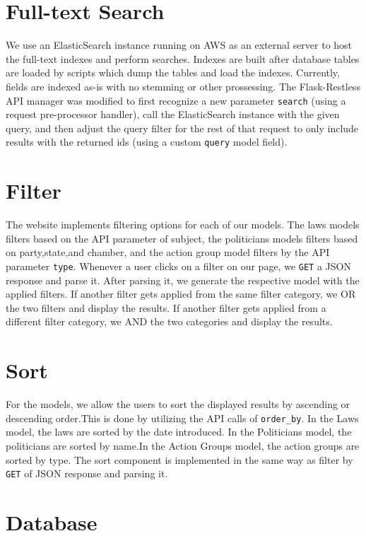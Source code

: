 \documentclass[12pt]{article}
\newcommand{\code}[1]{\texttt{#1}}
\begin{document}
\section{Full-text Search}

We use an ElasticSearch instance running on AWS as an external server to host the full-text indexes and perform searches. Indexes are built after database tables are loaded by scripts which dump the tables and load the indexes. Currently, fields are indexed as-is with no stemming or other prossessing. The Flask-Restless API manager was modified to first recognize a new parameter \code{search} (using a request pre-processor handler), call the ElasticSearch instance with the given query, and then adjust the query filter for the rest of that request to only include results with the returned ids (using a custom \code{query} model field).

\section{Filter}

The website implements filtering options for each of our models. The laws models filters based on the API parameter of subject, the politicians models filters based on party,state,and chamber, and the action group model filters by the API parameter \code{type}. Whenever a user clicks on a filter on our page, we \code{GET} a JSON response and parse it. After parsing it, we generate the respective model with the applied filters. If another filter gets applied from the same filter category, we OR the two filters and display the results. If another filter gets applied from a different filter category, we AND the two categories and display the results. 

\section{Sort}

For the models, we allow the users to sort the displayed results by ascending or descending order.This is done by utilizing the API calls of \code{order\_by}. In the Laws model, the laws are sorted by the date introduced. In the Politicians model, the politicians are sorted by name.In the Action Groups model, the action groups are sorted by type. The sort component is implemented in the same way as filter by \code{GET} of JSON response and parsing it.

\section{Database}
\end{document}
